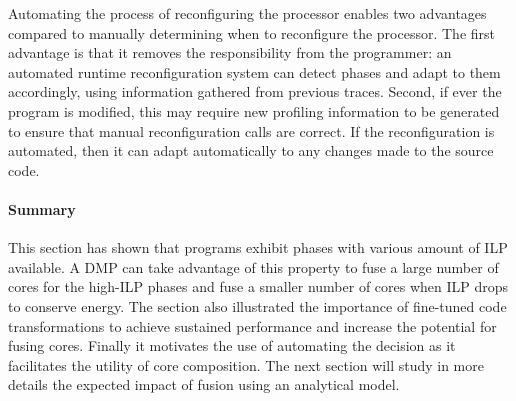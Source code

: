 Automating the process of reconfiguring the processor enables two advantages compared to manually determining when to reconfigure the processor.
The first advantage is that it removes the responsibility from the programmer: an automated runtime reconfiguration system can detect phases and adapt to them accordingly, using information gathered from previous traces.
Second, if ever the program is modified, this may require new profiling information to be generated to ensure that manual reconfiguration calls are correct.
If the reconfiguration is automated, then it can adapt automatically to any changes made to the source code.

\paragraph*{Summary}
This section has shown that programs exhibit phases with various amount of ILP available.
A DMP can take advantage of this property to fuse a large number of cores for the high-ILP phases and fuse a smaller number of cores when ILP drops to conserve energy.
The section also illustrated the importance of fine-tuned code transformations to achieve sustained performance and increase the potential for fusing cores.
Finally it motivates the use of automating the decision as it facilitates the utility of core composition.
The next section will study in more details the expected impact of fusion using an analytical model.

